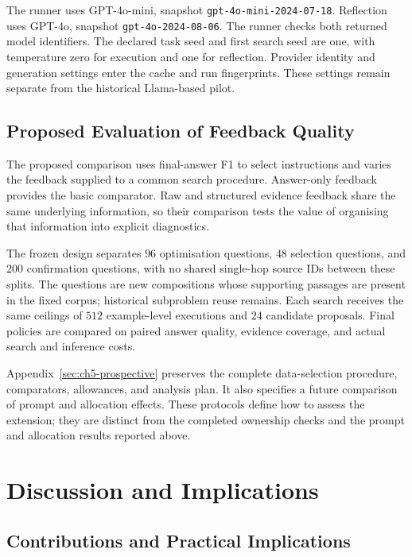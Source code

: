 The runner uses GPT-4o-mini, snapshot
\texttt{gpt-4o-mini-2024-07-18}. Reflection uses GPT-4o, snapshot
\texttt{gpt-4o-2024-08-06}. The runner checks both returned model identifiers.
The declared task seed and first search seed are one, with
temperature zero for execution and one for reflection. Provider identity
and generation settings enter the cache and run fingerprints. These
settings remain separate from the historical Llama-based pilot.

\subsection{Proposed Evaluation of Feedback Quality}
\label{sec:ch5-feedback-evaluation}

The proposed comparison uses final-answer F1 to select instructions and
varies the feedback supplied to a common search procedure. Answer-only
feedback provides the basic comparator. Raw and structured evidence feedback
share the same underlying information, so their comparison tests the value
of organising that information into explicit diagnostics.

The frozen design separates $96$ optimisation questions, $48$ selection
questions, and $200$ confirmation questions, with no shared single-hop source
IDs between these splits. The questions are new compositions whose supporting
passages are present in the fixed corpus; historical subproblem reuse remains.
Each search receives the same ceilings of $512$ example-level executions
and $24$ candidate proposals. Final policies are compared on paired answer
quality, evidence coverage, and actual search and inference costs.

Appendix~\ref{sec:ch5-prospective} preserves the complete data-selection
procedure, comparators, allowances, and analysis plan. It also specifies a
future comparison of prompt and allocation effects. These protocols define
how to assess the extension; they are distinct from the completed ownership
checks and the prompt and allocation results reported above.

\section{Discussion and Implications}

\subsection{Contributions and Practical Implications}

